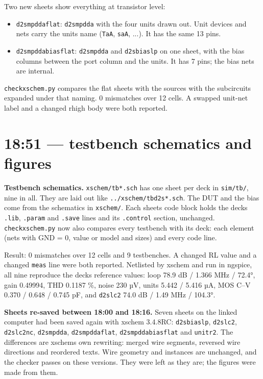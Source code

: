 \documentclass[11pt,a4paper]{article}
\providecommand{\tightlist}{\setlength{\itemsep}{0pt}\setlength{\parskip}{0pt}}
\renewcommand{\_}{\textunderscore\hspace{0pt}}
\begin{document}
Two new sheets show everything at transistor
level:

\begin{itemize}
\tightlist
\item
  \texttt{d2s\_mpdda\_flat}: \texttt{d2s\_mpdda}
  with the four units drawn out. Unit devices and
  nets carry the unit\textquotesingle s name
  (\texttt{Ta\_A}, \texttt{sa\_A}, ...). It has
  the same 13 pins.
\item
  \texttt{d2s\_mpdda\_bias\_flat}:
  \texttt{d2s\_mpdda} and \texttt{d2s\_bias\_lp}
  on one sheet, with the bias columns between the
  port column and the units. It has 7 pins; the
  bias nets are internal.
\end{itemize}

\texttt{check\_xschem.py} compares the flat sheets
with the sources with the subcircuits expanded
under that naming. 0 mismatches over 12 cells. A
swapped unit-net label and a changed rhigh body
were both reported.

\hypertarget{1851--testbench-schematics-and-figures}{%
\section{18:51 --- testbench schematics and
figures}\label{1851--testbench-schematics-and-figures}}

\textbf{Testbench schematics.}
\texttt{xschem/tb\_*.sch} has one sheet per deck
in \texttt{sim/tb/}, nine in all. They are laid
out like \texttt{../xschem/tb\_d2s\_*.sch}. The
DUT and the bias come from the schematics in
\texttt{xschem/}. Each sheet\textquotesingle s
code block holds the deck\textquotesingle s
\texttt{.lib}, \texttt{.param} and \texttt{.save}
lines and its \texttt{.control} section,
unchanged. \texttt{check\_xschem.py} now also
compares every testbench with its deck: each
element (nets with GND = 0, value or model and
sizes) and every code line.

Result: 0 mismatches over 12 cells and 9
testbenches. A changed RL value and a changed
\texttt{meas} line were both reported. Netlisted
by xschem and run in ngspice, all nine reproduce
the decks\textquotesingle{} reference values: loop
78.9 dB / 1.366 MHz / 72.4°, gain 0.49994, THD
0.1187 \%, noise 230 µV, units 5.442 / 5.416 µA,
MOS C--V 0.370 / 0.648 / 0.745 pF, and
\texttt{d2s\_lc2} 74.0 dB / 1.49 MHz / 104.3°.

\textbf{Sheets re-saved between 18:00 and 18:16.}
Seven sheets on the linked computer had been saved
again with xschem 3.4.8RC: \texttt{d2s\_bias\_lp},
\texttt{d2s\_lc2}, \texttt{d2s\_lc2\_nc},
\texttt{d2s\_mpdda}, \texttt{d2s\_mpdda\_flat},
\texttt{d2s\_mpdda\_bias\_flat} and
\texttt{unit\_r2}. The differences are
xschem\textquotesingle s own rewriting: merged
wire segments, reversed wire directions and
reordered texts. Wire geometry and instances are
unchanged, and the checker passes on these
versions. They were left as they are; the figures
were made from them.
\end{document}
